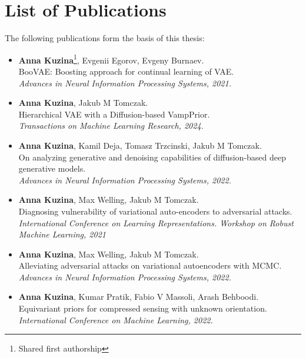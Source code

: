 \chapter*{List of Publications}\label{chapter:papers}

The following publications form the basis of this thesis:
\begin{itemize}[leftmargin=15pt, rightmargin=10pt]
    \item \textbf{Anna Kuzina}\footnote[1]{Shared first authorship}, Evgenii Egorov\footnotemark[1], Evgeny Burnaev. \\
    BooVAE: Boosting approach for continual learning of VAE. \\
    \textit{Advances in Neural Information Processing Systems, 2021.}
    \item \textbf{Anna Kuzina},  Jakub M Tomczak. \\ 
    Hierarchical VAE with a Diffusion-based VampPrior.\\
    \textit{Transactions on Machine Learning Research, 2024.}
    \item \textbf{Anna Kuzina}\footnotemark[1], Kamil Deja\footnotemark[1], Tomasz Trzcinski, Jakub M Tomczak. \\
    On analyzing generative and denoising capabilities of diffusion-based deep generative models. \\
    \textit{Advances in Neural Information Processing Systems, 2022.}
    \item \textbf{Anna Kuzina}, Max Welling, Jakub M Tomczak.  \\
    Diagnosing vulnerability of variational auto-encoders to adversarial attacks. \\
    \textit{International Conference on Learning Representations. Workshop on Robust Machine Learning, 2021}
    \item \textbf{Anna Kuzina}, Max Welling, Jakub M Tomczak.  \\
    Alleviating adversarial attacks on variational autoencoders with MCMC. \\
    \textit{Advances in Neural Information Processing Systems, 2022.}
    \item \textbf{Anna Kuzina}, Kumar Pratik, Fabio V Massoli, Arash Behboodi.\\ 
    Equivariant priors for compressed sensing with unknown orientation. \\
    \textit{International Conference on Machine Learning, 2022.}
\end{itemize}

